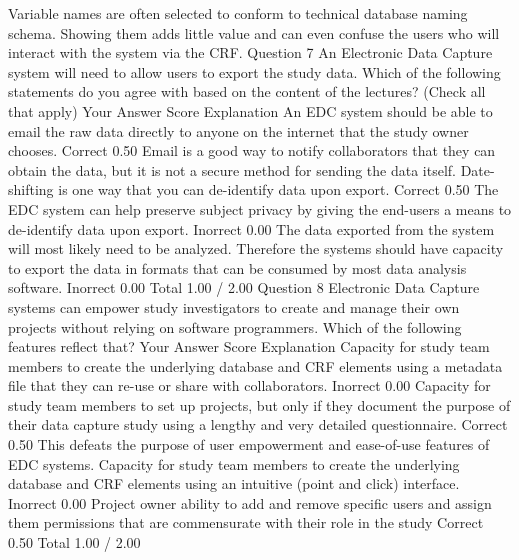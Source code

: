 Variable names are often selected to conform to technical database naming schema. Showing them adds little value and can even confuse the users who will interact with the system via the CRF.
Question 7
An Electronic Data Capture system will need to allow users to export the study data. Which of the following statements do you agree with based on the content of the lectures? (Check all that apply)
Your Answer		Score	Explanation
An EDC system should be able to email the raw data directly to anyone on the internet that the study owner chooses.	Correct	0.50	Email is a good way to notify collaborators that they can obtain the data, but it is not a secure method for sending the data itself.
Date-shifting is one way that you can de-identify data upon export.	Correct	0.50	
The EDC system can help preserve subject privacy by giving the end-users a means to de-identify data upon export.	Inorrect	0.00	
The data exported from the system will most likely need to be analyzed. Therefore the systems should have capacity to export the data in formats that can be consumed by most data analysis software.	Inorrect	0.00	
Total		1.00 / 2.00	
Question 8
Electronic Data Capture systems can empower study investigators to create and manage their own projects without relying on software programmers. Which of the following features reflect that?
Your Answer		Score	Explanation
Capacity for study team members to create the underlying database and CRF elements using a metadata file that they can re-use or share with collaborators.	Inorrect	0.00	
Capacity for study team members to set up projects, but only if they document the purpose of their data capture study using a lengthy and very detailed questionnaire.	Correct	0.50	This defeats the purpose of user empowerment and ease-of-use features of EDC systems.
Capacity for study team members to create the underlying database and CRF elements using an intuitive (point and click) interface.	Inorrect	0.00	
Project owner ability to add and remove specific users and assign them permissions that are commensurate with their role in the study	Correct	0.50	
Total		1.00 / 2.00
